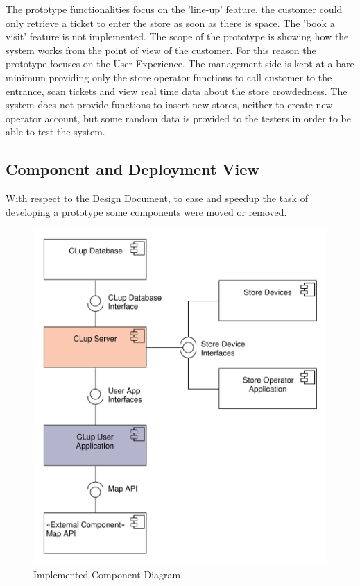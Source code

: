 The prototype functionalities focus on the 'line-up' feature, the customer could only retrieve a ticket to enter the store as soon as there is space. The 'book a visit' feature is not implemented.
The scope of the prototype is showing how the system works from the point of view of the customer. For this reason the prototype focuses on the User Experience. The management side is kept at a bare minimum providing only the store operator functions to call customer to the entrance, scan tickets and view real time data about the store crowdedness. The system does not provide functions to insert new stores, neither to create new operator account, but some random data is provided to the testers in order to be able to test the system.
\subsection{Component and Deployment View}
With respect to the Design Document, to ease and speedup the task of developing a prototype some components were moved or removed.
\begin{figure}[h!t]
    \centering
    \includegraphics[width=\textwidth]{Images/UML_general_component.pdf}
    \caption{\label{fig:General Component}Implemented Component Diagram}
\end{figure}


